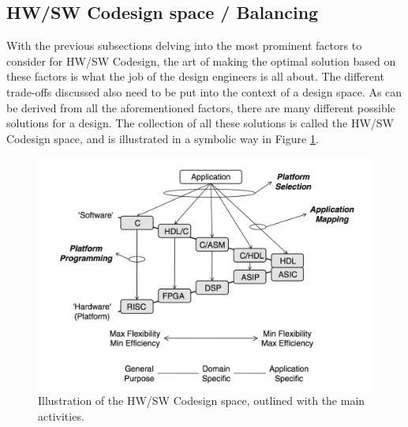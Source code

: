\subsection{HW/SW Codesign space / Balancing}
With the previous subsections delving into the most prominent factors to consider for HW/SW Codesign, the art of making the optimal solution based on these factors is what the job of the design engineers is all about. The different trade-offs discussed also need to be put into the context of a design space. As can be derived from all the aforementioned factors, there are many different possible solutions for a design. The collection of all these solutions is called the HW/SW Codesign space, and is illustrated in a symbolic way in Figure \ref{HWSWDesignspace}. 


\begin{figure}[H]
    \begin{center}
        \includegraphics[scale=0.52]{Attachments/HWSWDesignspace.png}
        \caption{Illustration of the HW/SW Codesign space, outlined with the main activities. }
        \label{HWSWDesignspace}
    \end{center}
\end{figure}


